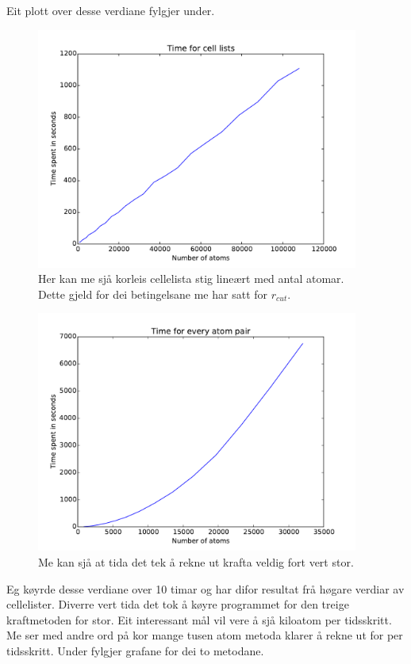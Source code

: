 \documentclass[12pt, a4paper]{article}
\theoremstyle{definition} \newtheorem*{definition}{Teorem}
\begin{document}
        Eit plott over desse verdiane fylgjer under.
        \begin{figure}[H]
            \centering
            \includegraphics[width=400px]{cellListsTime.pdf}
            \caption{Her kan me sjå korleis cellelista stig lineært med antal atomar. Dette gjeld for dei betingelsane me har satt for $r_{cut}$.}
        \end{figure}

        \begin{figure}[H]
            \centering
            \includegraphics[width=400px]{oldForceTime.pdf}
            \caption{Me kan sjå at tida det tek å rekne ut krafta veldig fort vert stor.}
        \end{figure}
        Eg køyrde desse verdiane over 10 timar og har difor resultat frå høgare verdiar av cellelister. Diverre vert tida det tok å køyre programmet for den treige kraftmetoden
        for stor. Eit interessant mål vil vere å sjå kiloatom per tidsskritt. Me ser med andre ord på kor mange tusen atom metoda klarer å rekne ut for per tidsskritt. Under 
        fylgjer grafane for dei to metodane.
\end{document}

